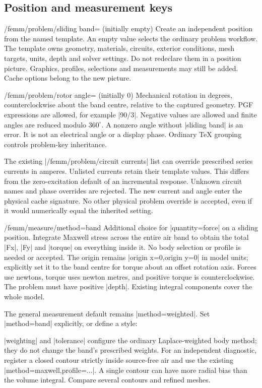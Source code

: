 \subsection{Position and measurement keys}
\begin{key}{/femm/problem/sliding band= (initially empty)}
Create an independent position from the named template. An empty value selects
the ordinary problem workflow. The template owns geometry, materials, circuits,
exterior conditions, mesh targets, units, depth and solver settings. Do not
redeclare them in a position picture. Graphics, profiles, selections and
measurements may still be added. Cache options belong to the new picture.
\end{key}
\begin{key}{/femm/problem/rotor angle= (initially 0)}
Mechanical rotation in degrees, counterclockwise about the band centre, relative
to the captured geometry. PGF expressions are allowed, for example |90/3|.
Negative values are allowed and finite angles are reduced modulo $360^\circ$.
A nonzero angle without |sliding band| is an error. It is not an electrical
angle or a display phase. Ordinary TeX grouping controls problem-key inheritance.
\end{key}
The existing |/femm/problem/circuit currents| list can override prescribed
series currents in amperes. Unlisted currents retain their template values.
This differs from the zero-excitation default of an incremental response.
Unknown circuit names and phase overrides are rejected. The new current and
angle enter the physical cache signature. No other physical problem override
is accepted, even if it would numerically equal the inherited setting.

\begin{key}{/femm/measure/method=band}
Additional choice for |quantity=force| on a sliding position. Integrate Maxwell
stress across the entire air band to obtain the total |Fx|, |Fy| and |torque|
on everything inside it. No body selection or profile is needed or accepted.
The origin remains |origin x=0,origin y=0| in model units; explicitly set it to
the band centre for torque about an offset rotation axis. Forces use newtons,
torque uses newton metres, and positive torque is counterclockwise. The problem
must have positive |depth|. Existing integral components cover the whole model.
\end{key}
The general measurement default remains |method=weighted|. Set |method=band|
explicitly, or define a style:
\begin{codeexample}
\femmmeasure[rotor torque,name=at-60,parameter=60]
\end{codeexample}
|weighting| and |tolerance| configure the ordinary Laplace-weighted body method;
they do not change the band's prescribed weights. For an independent diagnostic,
register a closed contour strictly inside source-free air and use the existing
|method=maxwell,profile=...|. A single contour can have more radial bias than
the volume integral. Compare several contours and refined meshes.

